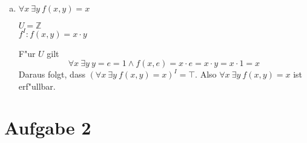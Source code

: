 \documentclass[10pt, oneside]{article}
\begin{document}
\begin{enumerate}[(a)]
    \item $\forall x \ \exists y\ f(x, y) = x$

        $U = \mathbb{Z}$ \\[5pt]
        $f^I : f(x, y) = x \cdot y$

        F"ur $U$ gilt
        \begin{equation*}
            \forall x \ \exists y\  y = e = 1 \land f(x, e) = x \cdot e = x \cdot y = x \cdot 1 = x
        \end{equation*}
        Daraus folgt, dass $(\forall x \ \exists y\ f(x, y) = x)^I = \top$.
        Also $\forall x \ \exists y\ f(x, y) = x$ ist erf"ullbar.

\end{enumerate}

\section{Aufgabe 2}
\end{document}
